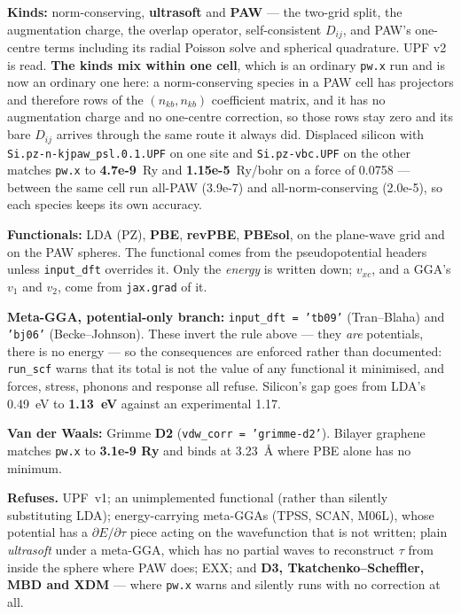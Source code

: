 \documentclass[11pt,a4paper]{article}
\newcommand{\code}[1]{\texttt{\small #1}}
\begin{document}
\textbf{Kinds:} norm-conserving, \textbf{ultrasoft} and \textbf{PAW} --- the
two-grid split, the augmentation charge, the overlap operator, self-consistent
$D_{ij}$, and PAW's one-centre terms including its radial Poisson solve and
spherical quadrature. UPF v2 is read. \textbf{The kinds mix within one cell},
which is an ordinary \code{pw.x} run and is now an ordinary one here: a
norm-conserving species in a PAW cell has projectors and therefore rows of the
$(n_{kb}, n_{kb})$ coefficient matrix, and it has no augmentation charge and no
one-centre correction, so those rows stay zero and its bare $D_{ij}$ arrives
through the same route it always did. Displaced silicon with
\code{Si.pz-n-kjpaw\_psl.0.1.UPF} on one site and \code{Si.pz-vbc.UPF} on the
other matches \code{pw.x} to \textbf{4.7e-9}~Ry and \textbf{1.15e-5}~Ry/bohr on
a force of 0.0758 --- between the same cell run all-PAW (3.9e-7) and
all-norm-conserving (2.0e-5), so each species keeps its own accuracy.

\textbf{Functionals:} LDA (PZ), \textbf{PBE}, \textbf{revPBE}, \textbf{PBEsol},
on the plane-wave grid and on the PAW spheres. The functional comes from the
pseudopotential headers unless \code{input\_dft} overrides it. Only the
\emph{energy} is written down; $v_{xc}$, and a GGA's $v_1$ and $v_2$, come from
\code{jax.grad} of it.

\textbf{Meta-GGA, potential-only branch:} \code{input\_dft = 'tb09'}
(Tran--Blaha) and \code{'bj06'} (Becke--Johnson). These invert the rule above
--- they \emph{are} potentials, there is no energy --- so the consequences are
enforced rather than documented: \code{run\_scf} warns that its total is not the
value of any functional it minimised, and forces, stress, phonons and response
all refuse. Silicon's gap goes from LDA's 0.49~eV to \textbf{1.13~eV} against an
experimental 1.17.

\textbf{Van der Waals:} Grimme \textbf{D2} (\code{vdw\_corr = 'grimme-d2'}).
Bilayer graphene matches \code{pw.x} to \textbf{3.1e-9 Ry} and binds at
3.23~\AA{} where PBE alone has no minimum.

\begin{refuses}
\textbf{Refuses.} UPF~v1; an unimplemented functional (rather than silently
substituting LDA); energy-carrying meta-GGAs (TPSS, SCAN, M06L), whose potential
has a $\partial E/\partial\tau$ piece acting on the wavefunction that is not
written; plain \emph{ultrasoft} under a meta-GGA, which has no partial waves to
reconstruct $\tau$ from inside the sphere where PAW does; EXX; and
\textbf{D3, Tkatchenko--Scheffler, MBD and XDM} --- where \code{pw.x} warns and
silently runs with no correction at all.
\end{refuses}
\end{document}
